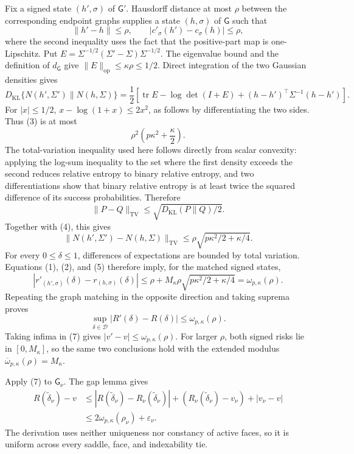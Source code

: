 Fix a signed state \((h',\sigma)\) of \(\mathsf G'\). Hausdorff distance at most \(\rho\) between the corresponding endpoint graphs supplies a state \((h,\sigma)\) of \(\mathsf G\) such that
\[
 \|h'-h\|\leq\rho,
 \qquad |c'_{\sigma}(h')-c_{\sigma}(h)|\leq\rho, \tag{2}
\]
where the second inequality uses the fact that the positive-part map is one-Lipschitz. Put \(E=\Sigma^{-1/2}(\Sigma'-\Sigma)\Sigma^{-1/2}\). The eigenvalue bound and the definition of \(d_{\mathsf G}\) give
\(\|E\|_{\mathrm{op}}\leq\kappa\rho\leq1/2\). Direct integration of the two Gaussian densities gives
\[
 D_{\mathrm{KL}}\{N(h',\Sigma')\|N(h,\Sigma)\}
 =\frac12\left[\operatorname{tr}E-\log\det(I+E)
 +(h-h')^{\top}\Sigma^{-1}(h-h')\right]. \tag{3}
\]
For \(|x|\leq1/2\), \(x-\log(1+x)\leq2x^2\), as follows by differentiating the two sides. Thus (3) is at most
\[
 \rho^2\left(p\kappa^2+\frac\kappa2\right). \tag{4}
\]
The total-variation inequality used here follows directly from scalar convexity: applying the log-sum inequality to the set where the first density exceeds the second reduces relative entropy to binary relative entropy, and two differentiations show that binary relative entropy is at least twice the squared difference of its success probabilities. Therefore
\[
 \|P-Q\|_{\mathrm{TV}}\leq\sqrt{D_{\mathrm{KL}}(P\|Q)/2}.
\]
Together with (4), this gives
\[
 \|N(h',\Sigma')-N(h,\Sigma)\|_{\mathrm{TV}}
 \leq\rho\sqrt{p\kappa^2/2+\kappa/4}. \tag{5}
\]
For every \(0\leq\delta\leq1\), differences of expectations are bounded by total variation. Equations (1), (2), and (5) therefore imply, for the matched signed states,
\[
 |r'_{(h',\sigma)}(\delta)-r_{(h,\sigma)}(\delta)|
 \leq\rho+M_{\kappa}\rho\sqrt{p\kappa^2/2+\kappa/4}
 =\omega_{p,\kappa}(\rho). \tag{6}
\]
Repeating the graph matching in the opposite direction and taking suprema proves
\[
 \sup_{\delta\in\mathcal D}|R'(\delta)-R(\delta)|
 \leq\omega_{p,\kappa}(\rho). \tag{7}
\]
Taking infima in (7) gives \(|v'-v|\leq\omega_{p,\kappa}(\rho)\). For larger \(\rho\), both signed risks lie in \([0,M_{\kappa}]\), so the same two conclusions hold with the extended modulus \(\overline\omega_{p,\kappa}(\rho)=M_{\kappa}\).

Apply (7) to \(\mathsf G_{\nu}\). The gap lemma gives
\[
\begin{aligned}
 R(\widetilde\delta_{\nu})-v
 &\leq |R(\widetilde\delta_{\nu})-R_{\nu}(\widetilde\delta_{\nu})|
 +(R_{\nu}(\widetilde\delta_{\nu})-v_{\nu})+|v_{\nu}-v|\\
 &\leq2\omega_{p,\kappa}(\rho_{\nu})+\varepsilon_{\nu}.
\end{aligned}\tag{8}
\]
The derivation uses neither uniqueness nor constancy of active faces, so it is uniform across every saddle, face, and indexability tie.

